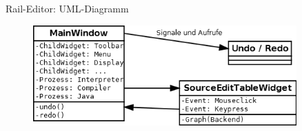 \begin{frame}{Rail-Editor: UML-Diagramm}	
	\begin{figure}
		\centering
		\includegraphics[width=0.9\textwidth]{editor-uebersicht}
	\end{figure}
\end{frame}